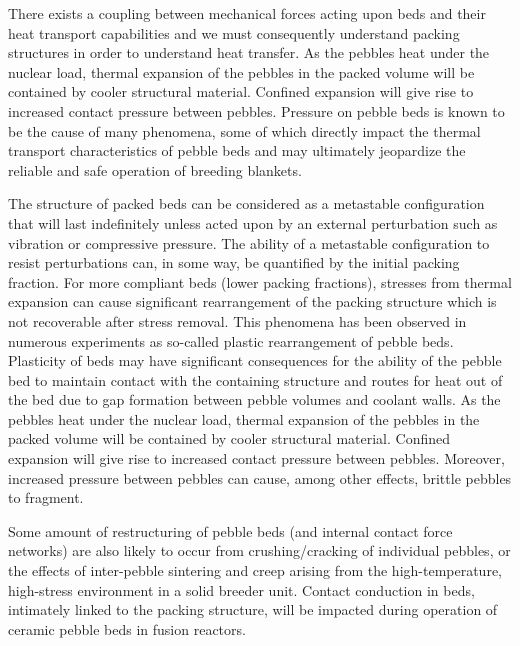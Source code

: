 There exists a coupling between mechanical forces acting upon beds and their heat transport capabilities and we must consequently understand packing structures in order to understand heat transfer. As the pebbles heat under the nuclear load, thermal expansion of the pebbles in the packed volume will be contained by cooler structural material. Confined expansion will give rise to increased contact pressure between pebbles. Pressure on pebble beds is known to be the cause of many phenomena, some of which directly impact the thermal transport characteristics of pebble beds and may ultimately jeopardize the reliable and safe operation of breeding blankets. 

The structure of packed beds can be considered as a metastable configuration that will last indefinitely unless acted upon by an external perturbation such as vibration or compressive pressure.\cite{Jaeger1996} The ability of a metastable configuration to resist perturbations can, in some way, be quantified by the initial packing fraction. For more compliant beds (lower packing fractions), stresses from thermal expansion can cause significant rearrangement of the packing structure which is not recoverable after stress removal. This phenomena has been observed in numerous experiments as so-called plastic rearrangement of pebble beds.\cite{Reimann:2002kl,Reimann:2000tw,Zhang2015} Plasticity of beds may have significant consequences for the ability of the pebble bed to maintain contact with the containing structure and routes for heat out of the bed due to gap formation between pebble volumes and coolant walls. As the pebbles heat under the nuclear load, thermal expansion of the pebbles in the packed volume will be contained by cooler structural material. Confined expansion will give rise to increased contact pressure between pebbles. Moreover, increased pressure between pebbles can cause, among other effects, brittle pebbles to fragment.

Some amount of restructuring of pebble beds (and internal contact force networks) are also likely to occur from crushing/cracking of individual pebbles, or the effects of inter-pebble sintering and creep arising from the high-temperature, high-stress environment in a solid breeder unit. Contact conduction in beds, intimately linked to the packing structure, will be impacted during operation of ceramic pebble beds in fusion reactors.


